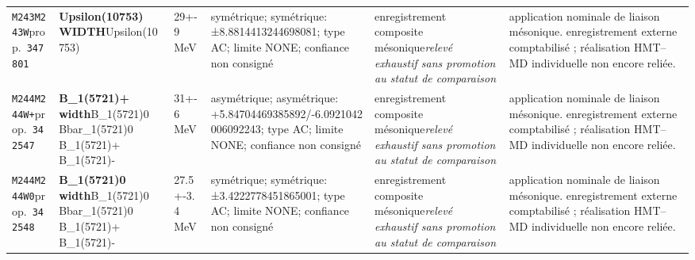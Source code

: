 \begin{landscape}
\begin{longtable}{L{1.85cm}L{4.45cm}L{2.35cm}L{4.05cm}L{3.35cm}L{7.15cm}}
\texttt{M243}\newline \texttt{M243W}\newline prop.\ \texttt{347801} & \textbf{Upsilon(10753) WIDTH}\newline Upsilon(10753) & 29+-9\,MeV & symétrique; symétrique: ±8.8814413244698081; type AC; limite NONE; confiance non consigné & enregistrement composite mésonique\newline \emph{relevé exhaustif sans promotion au statut de comparaison} & application nominale de liaison mésonique. enregistrement externe comptabilisé ; réalisation HMT--MD individuelle non encore reliée. \\
\texttt{M244}\newline \texttt{M244W+}\newline prop.\ \texttt{342547} & \textbf{B\_\allowbreak{}1(5721)+ width}\newline B\_\allowbreak{}1(5721)0 \textbar{}\allowbreak{} Bbar\_\allowbreak{}1(5721)0 \textbar{}\allowbreak{} B\_\allowbreak{}1(5721)+ \textbar{}\allowbreak{} B\_\allowbreak{}1(5721)- & 31+-6\,MeV & asymétrique; asymétrique: +5.84704469385892/-6.0921042006092243; type AC; limite NONE; confiance non consigné & enregistrement composite mésonique\newline \emph{relevé exhaustif sans promotion au statut de comparaison} & application nominale de liaison mésonique. enregistrement externe comptabilisé ; réalisation HMT--MD individuelle non encore reliée. \\
\texttt{M244}\newline \texttt{M244W0}\newline prop.\ \texttt{342548} & \textbf{B\_\allowbreak{}1(5721)0 width}\newline B\_\allowbreak{}1(5721)0 \textbar{}\allowbreak{} Bbar\_\allowbreak{}1(5721)0 \textbar{}\allowbreak{} B\_\allowbreak{}1(5721)+ \textbar{}\allowbreak{} B\_\allowbreak{}1(5721)- & 27.5+-3.4\,MeV & symétrique; symétrique: ±3.4222778451865001; type AC; limite NONE; confiance non consigné & enregistrement composite mésonique\newline \emph{relevé exhaustif sans promotion au statut de comparaison} & application nominale de liaison mésonique. enregistrement externe comptabilisé ; réalisation HMT--MD individuelle non encore reliée. \\

\end{longtable}
\end{landscape}
